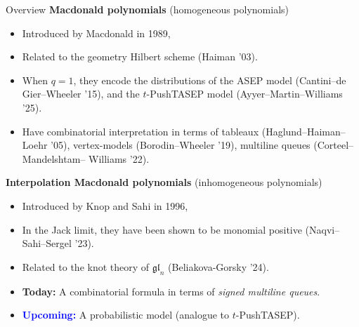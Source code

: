\documentclass[10pt]{beamer}
\theoremstyle{definition}
\theoremstyle{remark}
\begin{document}
\begin{frame}{Overview}
    \textbf{Macdonald polynomials} (homogeneous polynomials)
    \vspace{-0.5cm}
        \begin{itemize}
        \item Introduced by Macdonald in 1989,
         \item Related to the geometry Hilbert scheme (Haiman '03).
         \item When $q=1$, they encode the distributions of the ASEP model (Cantini--de Gier--Wheeler '15), and the $t$-PushTASEP model (Ayyer--Martin--Williams '25).
         \item Have combinatorial interpretation in terms of  tableaux (Haglund--Haiman--Loehr '05), vertex-models (Borodin--Wheeler '19), multiline queues (Corteel--Mandelshtam-- Williams '22). 
     \end{itemize}
\vspace{-0.2cm}
     
    \textbf{Interpolation Macdonald polynomials} (inhomogeneous polynomials)
\begin{itemize}
\vspace{-0.5cm}
    \item Introduced by Knop and Sahi in 1996,
    \item In the Jack limit, they have been shown to be monomial positive (Naqvi–Sahi–Sergel '23).
    \item Related to the knot theory of $\mathfrak{gl}_n$ (Beliakova-Gorsky '24).
    \item \textbf{\textcolor{uibred}{Today:}} A combinatorial formula in terms of \emph{signed multiline queues}. 
    \item \textbf{\textcolor{blue}{Upcoming:}} A probabilistic model (analogue to $t$-PushTASEP). 
\end{itemize}
    
\end{frame}
\end{document}
